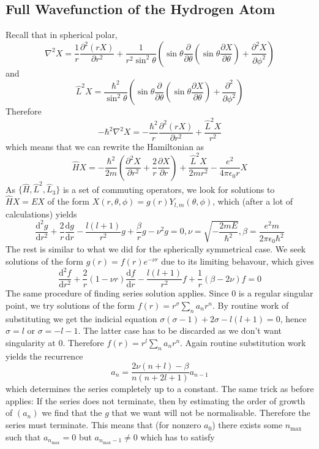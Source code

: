 \subsection{Full Wavefunction of the Hydrogen Atom}
Recall that in spherical polar,
$$\nabla^2X=\frac{1}{r}\frac{\partial^2(rX)}{\partial r^2}+\frac{1}{r^2\sin^2\theta}\left( \sin\theta\frac{\partial}{\partial\theta}\left( \sin\theta\frac{\partial X}{\partial\theta} \right)+\frac{\partial^2X}{\partial\phi^2} \right)$$
and
$$\hat{L}^2X=\frac{\hbar^2}{\sin^2\theta}\left( \sin\theta\frac{\partial}{\partial\theta}\left( \sin\theta\frac{\partial X}{\partial\theta} \right) +\frac{\partial^2}{\partial\phi^2}\right)$$
Therefore
$$-\hbar^2\nabla^2X=-\frac{\hbar^2}{r}\frac{\partial^2(rX)}{\partial r^2}+\frac{\hat{L}^2X}{r^2}$$
which means that we can rewrite the Hamiltonian as
$$\hat{H}X=-\frac{\hbar^2}{2m}\left( \frac{\partial^2X}{\partial r^2}+\frac{2}{r}\frac{\partial X}{\partial r} \right)+\frac{\hat{L}^2X}{2mr^2}-\frac{e^2}{4\pi\epsilon_0r}X$$
As $\{\hat{H},\hat{L}^2,\hat{L}_3\}$ is a set of commuting operators, we look for solutions to $\hat{H}X=EX$ of the form $X(r,\theta,\phi)=g(r)Y_{l,m}(\theta,\phi)$, which (after a lot of calculations) yields
$$\frac{\mathrm d^2g}{\mathrm dr^2}+\frac{2}{r}\frac{\mathrm dg}{\mathrm dr}-\frac{l(l+1)}{r^2}g+\frac{\beta}{r}g-\nu^2g=0,\nu=\sqrt{-\frac{2mE}{\hbar^2}},\beta=\frac{e^2m}{2\pi\epsilon_0\hbar^2}$$
The rest is similar to what we did for the spherically symmetrical case.
We seek solutions of the form $g(r)=f(r)e^{-\nu r}$ due to its limiting behavour, which gives
$$\frac{\mathrm d^2f}{\mathrm dr^2}+\frac{2}{r}(1-\nu r)\frac{\mathrm df}{\mathrm dr}-\frac{l(l+1)}{r^2}f+\frac{1}{r}(\beta-2\nu)f=0$$
The same procedure of finding series solution applies.
Since $0$ is a regular singular point, we try solutions of the form $f(r)=r^\sigma\sum_na_nr^n$.
By routine work of substituting we get the indicial equation $\sigma(\sigma-1)+2\sigma-l(l+1)=0$, hence $\sigma=l$ or $\sigma=-l-1$.
The latter case has to be discarded as we don't want singularity at $0$.
Therefore $f(r)=r^l\sum_na_nr^n$.
Again routine substitution work yields the recurrence
$$a_n=\frac{2\nu(n+l)-\beta}{n(n+2l+1)}a_{n-1}$$
which determines the series completely up to a constant.
The same trick as before applies:
If the series does not terminate, then by estimating the order of growth of $(a_n)$ we find that the $g$ that we want will not be normalisable.
Therefore the series must terminate.
This means that (for nonzero $a_0$) there exists some $n_{\max{}}$ such that $a_{n_{\max{}}}=0$ but $a_{n_{\max{}}-1}\neq0$ which has to satisfy
